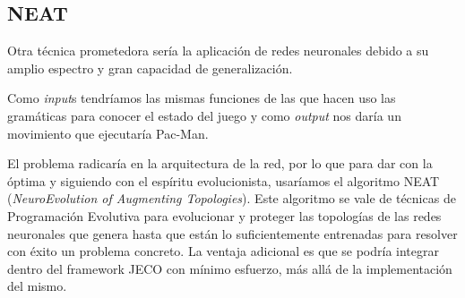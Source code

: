 \subsection{NEAT}
Otra técnica prometedora sería la aplicación de redes neuronales debido a su amplio espectro y gran capacidad de generalización.

Como \textit{input}s tendríamos las mismas funciones de las que hacen uso las gramáticas para conocer el estado del juego y como \textit{output} nos daría un movimiento que ejecutaría Pac-Man.

El problema radicaría en la arquitectura de la red, por lo que para dar con la óptima y siguiendo con el espíritu evolucionista, usaríamos el algoritmo NEAT\cite{stanley2002evolving} (\textit{NeuroEvolution of Augmenting Topologies}). Este algoritmo se vale de técnicas de Programación Evolutiva para evolucionar y proteger las topologías de las redes neuronales que genera hasta que están lo suficientemente entrenadas para resolver con éxito un problema concreto. La ventaja adicional es que se podría integrar dentro del framework JECO con mínimo esfuerzo, más allá de la implementación del mismo.
